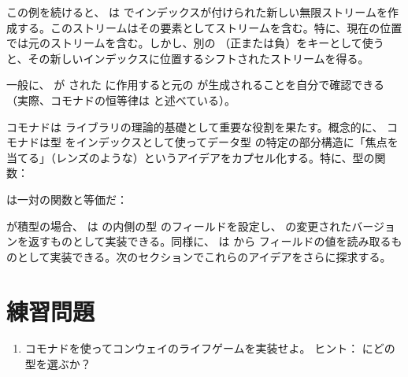 この例を続けると、 は  でインデックスが付けられた新しい無限ストリームを作成する。このストリームはその要素としてストリームを含む。特に、現在の位置では元のストリームを含む。しかし、別の （正または負）をキーとして使うと、その新しいインデックスに位置するシフトされたストリームを得る。

一般に、 が  された  に作用すると元の  が生成されることを自分で確認できる（実際、コモナドの恒等律は  と述べている）。

 コモナドは  ライブラリの理論的基礎として重要な役割を果たす。概念的に、 コモナドは型  をインデックスとして使ってデータ型  の特定の部分構造に「焦点を当てる」（レンズのような）というアイデアをカプセル化する。特に、型の関数：

は一対の関数と等価だ：

 が積型の場合、 は  の内側の型  のフィールドを設定し、 の変更されたバージョンを返すものとして実装できる。同様に、 は  から  フィールドの値を読み取るものとして実装できる。次のセクションでこれらのアイデアをさらに探求する。

\section{練習問題}

\begin{enumerate}
  \tightlist
  \item
         コモナドを使ってコンウェイのライフゲームを実装せよ。
        ヒント： にどの型を選ぶか？
\end{enumerate}
